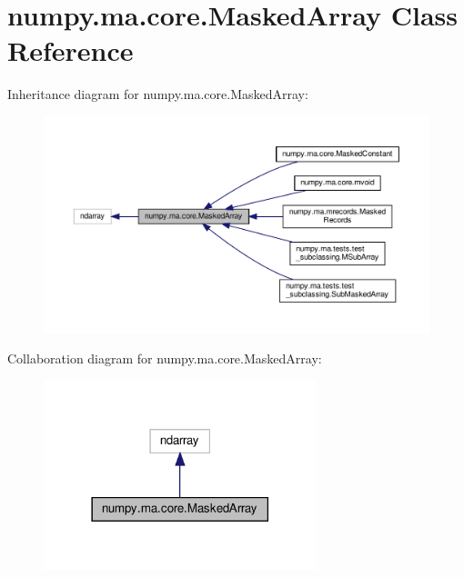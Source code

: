 \hypertarget{classnumpy_1_1ma_1_1core_1_1MaskedArray}{}\section{numpy.\+ma.\+core.\+Masked\+Array Class Reference}
\label{classnumpy_1_1ma_1_1core_1_1MaskedArray}


Inheritance diagram for numpy.\+ma.\+core.\+Masked\+Array\+:
\nopagebreak
\begin{figure}[H]
\begin{center}
\leavevmode
\includegraphics[width=350pt]{classnumpy_1_1ma_1_1core_1_1MaskedArray__inherit__graph}
\end{center}
\end{figure}


Collaboration diagram for numpy.\+ma.\+core.\+Masked\+Array\+:
\nopagebreak
\begin{figure}[H]
\begin{center}
\leavevmode
\includegraphics[width=225pt]{classnumpy_1_1ma_1_1core_1_1MaskedArray__coll__graph}
\end{center}
\end{figure}
